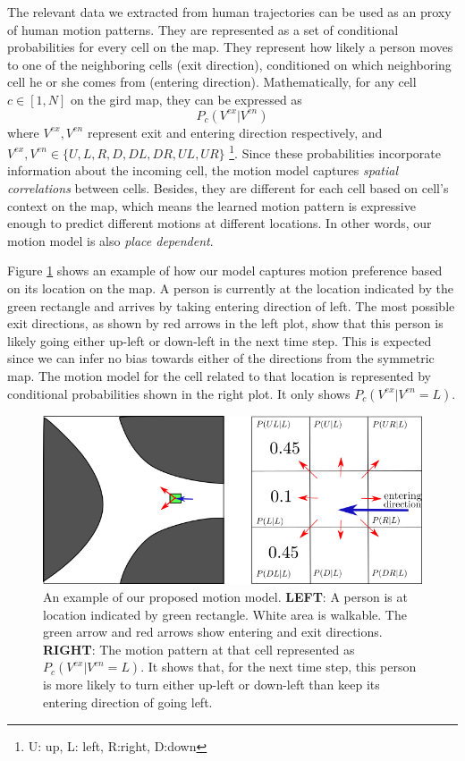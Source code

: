 The relevant data we extracted from human trajectories can be used as an proxy of human motion patterns. They are represented as a set of conditional probabilities for every cell on the map. They represent how likely a person moves to one of the neighboring cells (exit direction), conditioned on which neighboring cell he or she comes from (entering direction). Mathematically, for any cell $c \in [1,N]$ on the gird map, they can be expressed as
\begin{equation}
P_c(V^{ex}|V^{en}) 
\end{equation}
where $V^{ex}, V^{en}$ represent exit and entering direction respectively, and $V^{ex}, V^{en} \in \{U, L, R, D, DL, DR, UL, UR\}$ \footnote{U: up, L: left, R:right, D:down}.
Since these probabilities incorporate information about the incoming cell, the motion model captures \textit{spatial correlations} between cells. Besides, they are different for each cell based on cell’s context on the map, which means the learned motion pattern is expressive enough to predict different motions at different locations. In other words, our motion model is also \textit{place dependent}.

Figure \ref{fig:condi_prob_example} shows an example of how our model captures motion preference based on its location on the map. A person is currently at the location indicated by the green rectangle and arrives by taking entering direction of left. The most possible exit directions, as shown by red arrows in the left plot, show that this person is likely going either up-left or down-left in the next time step. This is expected since we can infer no bias towards either of the directions from the symmetric map. The motion model for the cell related to that location is represented by conditional probabilities shown in the right plot. It only shows $P_c(V^{ex}|V^{en}=L)$.
\begin{figure}[ht]
  \centering
    \includegraphics[width=.85\textwidth]{figures/bofmp_example.png}
    \caption[An example of our proposed motion model.]{An example of our proposed motion model. \textbf{LEFT}: A person is at location indicated by green rectangle. White area is walkable. The green arrow and red arrows show entering and exit directions. \textbf{RIGHT}: The motion pattern at that cell represented as $P_c(V^{ex}|V^{en}=L)$. It shows that, for the next time step, this person is more likely to turn either up-left or down-left than keep its entering direction of going left.}
    \label{fig:condi_prob_example}
\end{figure}

